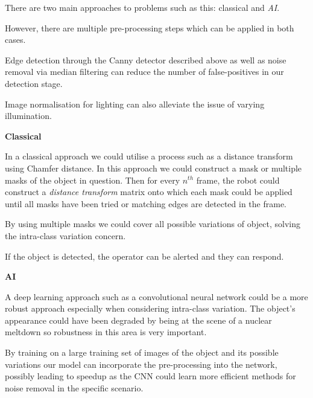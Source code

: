 \documentclass[12pt,a4paper]{article}
\newcounter{question}\setcounter{question}{1}
\begin{document}
\begin{enumerate}
\begin{enumerate}
\begin{enumerate}
                                There are two main approaches to problems such as this: classical and \textit{AI}.

                                However, there are multiple pre-processing steps which can be applied in both cases.

                                Edge detection through the Canny detector described above as well as noise removal via median filtering can reduce the number of false-positives in our detection stage.

                                Image normalisation for lighting can also alleviate the issue of varying illumination.

                                \textbf{Classical}

                                In a classical approach we could utilise a process such as a distance transform using Chamfer distance. In this approach we could construct a mask or multiple masks of the object in question. Then for every $n^{th}$ frame, the robot could construct a \textit{distance transform} matrix onto which each mask could be applied until all masks have been tried or matching edges are detected in the frame.

                                By using multiple masks we could cover all possible variations of object, solving the intra-class variation concern.

                                If the object is detected, the operator can be alerted and they can respond.

                                \textbf{AI}

                                A deep learning approach such as a convolutional neural network could be a more robust approach especially when considering intra-class variation. The object's appearance could have been degraded by being at the scene of a nuclear meltdown so robustness in this area is very important.

                                By training on a large training set of images of the object and its possible variations our model can incorporate the pre-processing into the network, possibly leading to speedup as the CNN could learn more efficient methods for noise removal in the specific scenario.
                        \end{enumerate}


                \end{enumerate}

  \end{enumerate}
\end{document}
